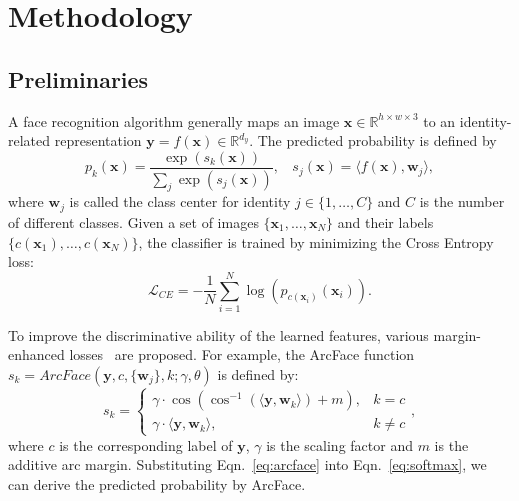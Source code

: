 \documentclass[letterpaper]{article} %
\begin{document}
\section{Methodology}
\label{sec:method}

\subsection{Preliminaries}
\label{ssec:preliminary}
A face recognition algorithm generally maps an image $\bm{x} \in \mathbb{R}^{h\times w\times 3}$ to an identity-related representation $\bm{y} = f(\bm{x}) \in \mathbb{R}^{d_y}$. %
The predicted probability is defined by
\begin{equation}
  p_k(\bm{x}) = \frac{\exp (s_k(\bm{x}))}{\sum_j \exp(s_j(\bm{x}))},~~~~s_j(\bm{x}) = \langle f(\bm{x}), \bm{w}_j\rangle,
  \label{eq:softmax}
\end{equation}
where $\bm{w}_j$ is called the class center for identity $j \in \{1, \dots, C\}$ and $C$ is the number of different classes.
Given a set of images $\{\bm{x}_1,\dots, \bm{x}_N\}$ and their labels $\{c(\bm{x}_1), \dots, c(\bm{x}_N)\}$, the classifier is trained by minimizing the Cross Entropy loss:
\begin{equation}
  \mathcal{L}_{CE} = -\frac{1}{N} \sum_{i = 1}^{N} \log \left(p_{c(\bm{x}_i)}(\bm{x}_i)\right).
  \label{eq:cross_entropy}
\end{equation}

To improve the discriminative ability of the learned features, various margin-enhanced losses~\cite{deng2019arcface,wang2018cosface} are proposed. %
For example, the ArcFace function $s_k = ArcFace(\bm{y}, c, \{\bm{w}_j\}, k; \gamma, \theta)$ is defined by:
\begin{equation}
  s_k =
  \begin{cases}
    \gamma \cdot \cos( \cos^{-1}( \langle \bm{y}, \bm{w}_k \rangle) + m), & k = c\\
    \gamma \cdot \langle \bm{y}, \bm{w}_k \rangle, & k \neq c
  \end{cases},
  \label{eq:arcface}
\end{equation}
where $c$ is the corresponding label of $\bm{y}$, $\gamma$ is the scaling factor and $m$ is the additive arc margin.
Substituting Eqn.~\ref{eq:arcface} into Eqn.~\ref{eq:softmax}, we can derive the predicted probability by ArcFace.
\end{document}
